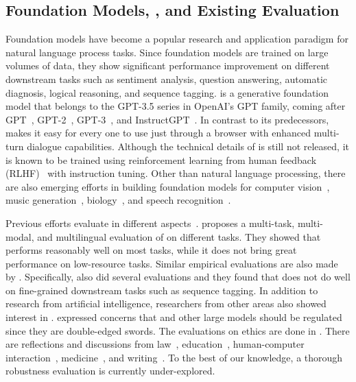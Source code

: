 \subsection{Foundation Models, \chat, and Existing Evaluation}

Foundation models have become a popular research and application paradigm for natural language process tasks.
Since foundation models are trained on large volumes of data, they show significant performance improvement on different downstream tasks such as sentiment analysis, question answering, automatic diagnosis, logical reasoning, and sequence tagging.
\chat is a generative foundation model that belongs to the GPT-3.5 series in OpenAI's GPT family, coming after GPT~\cite{radford2018improving}, GPT-2~\cite{radford2019language}, GPT-3~\cite{brown2020language}, and InstructGPT~\cite{ouyang2022training}.
In contrast to its predecessors, \chat makes it easy for every one to use just through a browser with enhanced multi-turn dialogue capabilities.
Although the technical details of \chat is still not released, it is known to be trained using reinforcement learning from human feedback (RLHF)~\cite{christiano2017deep} with instruction tuning.
Other than natural language processing, there are also emerging efforts in building foundation models for computer vision~\cite{dehghani2023scaling}, music generation~\cite{agostinelli2023musiclm}, biology~\cite{luo2022biogpt,lee2020biobert}, and speech recognition~\cite{radford2022robust}.

Previous efforts evaluate \chat in different aspects~\cite{van2023chatgpt}.
\cite{bang2023multitask} proposes a multi-task, multi-modal, and multilingual evaluation of \chat on different tasks.
They showed that \chat performs reasonably well on most tasks, while it does not bring great performance on low-resource tasks.
Similar empirical evaluations are also made by \cite{gozalo2023chatgpt,azaria2022chatgpt}.
Specifically, \cite{qin2023chatgpt} also did several evaluations and they found that \chat does not do well on fine-grained downstream tasks such as sequence tagging.
In addition to research from artificial intelligence, researchers from other areas also showed interest in \chat.
\cite{hacker2023regulating,shen2023chatgpt} expressed concerns that \chat and other large models should be regulated since they are double-edged swords.
The evaluations on ethics are done in \cite{zhuo2023exploring}.
There are reflections and discussions from law~\cite{choi2023chatgpt}, education~\cite{khalil2023will,m2022exploring,susnjak2022chatgpt,guo2023close}, human-computer interaction~\cite{tabone2023using}, medicine~\cite{jeblick2022chatgpt}, and writing~\cite{biswas2023chatgpt}.
To the best of our knowledge, a thorough robustness evaluation is currently under-explored.


